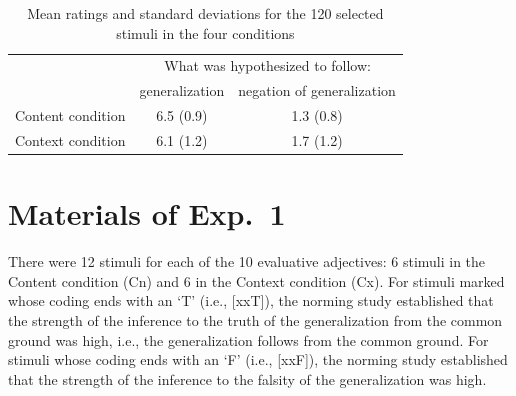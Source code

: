 \documentclass[11pt,fleqn]{article}
\newcommand{\6}{\mbox{$[\hspace*{-.6mm}[$}}
\newcommand{\9}{\mbox{$]\hspace*{-.6mm}]$}}
\begin{document}
\begin{table}[!h]
\centering

\begin{tabular}{l|cc}
& \multicolumn{2}{c}{What was hypothesized to follow:} \\
& generalization & negation of generalization \\\hline

Content condition &  6.5 (0.9) &  1.3 (0.8) \\
Context condition &  6.1 (1.2) &  1.7 (1.2) \\

\hline
\end{tabular}

\caption{Mean ratings and standard deviations for the 120 selected stimuli in the four conditions}\label{t-mean-final}

\end{table}

%
%
%


\section{Materials of Exp.~1}\label{a-Exp1}

There were 12 stimuli for each of the 10 evaluative adjectives: 6 stimuli in the Content condition (Cn) and 6 in the Context condition (Cx). For stimuli marked whose coding ends with an `T' (i.e., [xxT]), the norming study established that the strength of the inference to the truth of the generalization from the common ground was high, i.e., the generalization follows from the common ground. For stimuli whose coding ends with an `F' (i.e., [xxF]), the norming study established that the strength of the inference to the falsity of the generalization was high.
\end{document}
